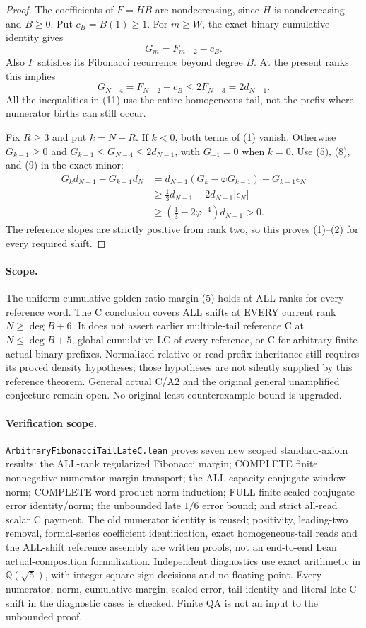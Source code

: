 \begin{proof}
The coefficients of $F=HB$ are nondecreasing, since $H$ is
nondecreasing and $B\ge0$. Put $c_B=B(1)\ge1$.
For $m\ge W$, the exact binary cumulative identity gives
\[
                         G_m=F_{m+2}-c_B.                 \tag{10}
\]
Also $F$ satisfies its Fibonacci recurrence beyond degree $B$.
At the present ranks this implies
\[
 G_{N-4}=F_{N-2}-c_B\le2F_{N-3}=2d_{N-1}.                \tag{11}
\]
All the inequalities in (11) use the entire homogeneous tail,
not the prefix where numerator births can still occur.

Fix $R\ge3$ and put $k=N-R$. If $k<0$, both terms of (1)
vanish. Otherwise $G_{k-1}\ge0$ and
$G_{k-1}\le G_{N-4}\le2d_{N-1}$, with $G_{-1}=0$ when $k=0$.
Use (5), (8), and (9) in the exact minor:
\[
 \begin{split}
 G_kd_{N-1}-G_{k-1}d_N
 &=d_{N-1}(G_k-\varphi G_{k-1})-G_{k-1}\epsilon_N\\
 &\ge \tfrac13d_{N-1}-2d_{N-1}|\epsilon_N|\\
 &\ge(\tfrac13-2\varphi^{-4})d_{N-1}>0.
 \end{split}
\]
The reference slopes are strictly positive from rank two, so this
proves (1)--(2) for every required shift.
\end{proof}

\paragraph{Scope.}
The uniform cumulative golden-ratio margin (5) holds at ALL ranks
for every reference word. The C conclusion covers ALL shifts at
EVERY current rank $N\ge\deg B+6$.
It does not assert earlier multiple-tail reference C at
$N\le\deg B+5$, global cumulative LC of every reference, or C for
arbitrary finite actual binary prefixes. Normalized-relative or
read-prefix inheritance still requires its proved density hypotheses;
those hypotheses are not silently supplied by this reference theorem.
General actual C/A2 and the original general unamplified conjecture
remain open. No original least-counterexample bound is upgraded.

\paragraph{Verification scope.}
\texttt{ArbitraryFibonacciTailLateC.lean} proves seven new scoped
standard-axiom results: the ALL-rank regularized Fibonacci margin;
COMPLETE finite nonnegative-numerator margin transport; the ALL-capacity
conjugate-window norm; COMPLETE word-product norm induction; FULL
finite scaled conjugate-error identity/norm; the unbounded late
$1/6$ error bound; and strict all-read scalar C payment.
The old numerator identity is reused; positivity, leading-two removal,
formal-series coefficient identification, exact homogeneous-tail reads
and the ALL-shift reference assembly are written proofs, not an
end-to-end Lean actual-composition formalization.
Independent diagnostics use exact arithmetic in $\mathbb Q(\sqrt5)$,
with integer-square sign decisions and no floating point. Every
numerator, norm, cumulative margin, scaled error, tail identity and
literal late C shift in the diagnostic cases is checked. Finite QA is
not an input to the unbounded proof.

